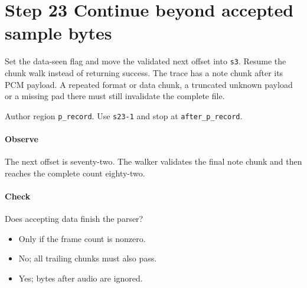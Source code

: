 \section{Step 23 Continue beyond accepted sample bytes}\label{pcm-wav-s23}
Set the data-seen flag and move the validated next offset into \texttt{s3}. Resume the chunk walk instead of returning success. The trace has a note chunk after its PCM payload. A repeated format or data chunk, a truncated unknown payload or a missing pad there must still invalidate the complete file.

Author region \texttt{p\_record}. Use \texttt{s23-1} and stop at \texttt{after\_p\_record}.

\paragraph{Observe} The next offset is seventy-two. The walker validates the final note chunk and then reaches the complete count eighty-two.

\paragraph{Check} Does accepting data finish the parser?
\begin{itemize}
  \item[A.] Only if the frame count is nonzero.
  \item[B.] No; all trailing chunks must also pass.
  \item[C.] Yes; bytes after audio are ignored.
\end{itemize}
